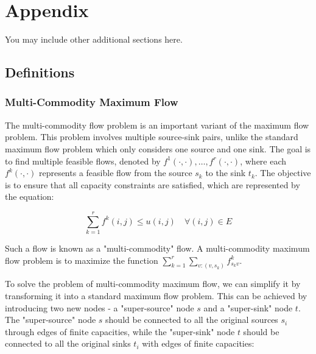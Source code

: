 \documentclass{article} %
\theoremstyle{bfnote}
\begin{document}
\pagebreak






\pagebreak
\appendix
\section{Appendix}
You may include other additional sections here.

\subsection{Definitions}

\subsubsection{Multi-Commodity Maximum Flow}
The multi-commodity flow problem is an important variant of the maximum flow problem. This problem involves multiple source-sink pairs, unlike the standard maximum flow problem which only considers one source and one sink. The goal is to find multiple feasible flows, denoted by $f^1(\cdot, \cdot), \ldots, f^r(\cdot, \cdot)$, where each $f^k(\cdot, \cdot)$ represents a feasible flow from the source $s_k$ to the sink $t_k$. The objective is to ensure that all capacity constraints are satisfied, which are represented by the equation:

\begin{equation*}
	\sum_{k=1}^r f^k(i, j) \leq u(i, j) \quad \forall(i, j) \in E
\end{equation*}

Such a flow is known as a "multi-commodity" flow. A multi-commodity maximum flow problem is to maximize the function $\sum_{k=1}^r \sum_{v:(v, s_k)} f^k_{s_k v}$.


To solve the problem of multi-commodity maximum flow, we can simplify it by transforming it into a standard maximum flow problem. This can be achieved by introducing two new nodes - a "super-source" node $s$ and a "super-sink" node $t$. The "super-source" node $s$ should be connected to all the original sources $s_i$ through edges of finite capacities, while the "super-sink" node $t$ should be connected to all the original sinks $t_i$ with edges of finite capacities:
\end{document}
